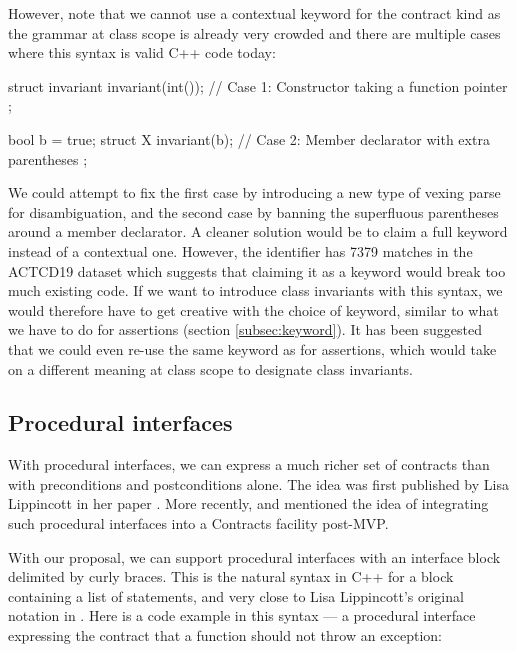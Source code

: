 However, note that we cannot use a contextual keyword for the contract kind  as the grammar at class scope is already very crowded and there are multiple cases where this syntax is valid C++ code today:

\begin{codeblock}
struct invariant {
  invariant(int());   // Case 1: Constructor taking a function pointer
};
\end{codeblock}
\pagebreak %
\begin{codeblock}
bool b = true;
struct X {
  invariant(b);   // Case 2: Member declarator with extra parentheses
};
\end{codeblock}

We could attempt to fix the first case by introducing a new type of vexing parse for disambiguation, and the second case by banning the superfluous parentheses around a member declarator. A cleaner solution would be to claim a full keyword instead of a contextual one. However, the identifier  has 7379 matches in the ACTCD19 dataset which suggests that claiming it as a keyword would break too much existing code. If we want to introduce class invariants with this syntax, we would therefore have to get creative with the choice of keyword, similar to what we have to do for assertions (section \ref{subsec:keyword}). It has been suggested that we could even re-use the same keyword as for assertions, which would take on a different meaning at class scope to designate class invariants.

\subsection{Procedural interfaces}
\label{subsec:interfaces}

With procedural interfaces, we can express a much richer set of contracts than with preconditions and postconditions alone. The idea was first published by Lisa Lippincott in her paper \cite{P0465R0}. More recently, \cite{P2885R3} and \cite{P2935R3} mentioned the idea of integrating such procedural interfaces into a Contracts facility post-MVP.

With our proposal, we can support procedural interfaces with an interface block delimited by curly braces. This is the natural syntax in C++ for a block containing a list of statements, and very close to Lisa Lippincott's original notation in \cite{P0465R0}. Here is a code example in this syntax --- a procedural interface expressing the contract that a function should not throw an exception:

